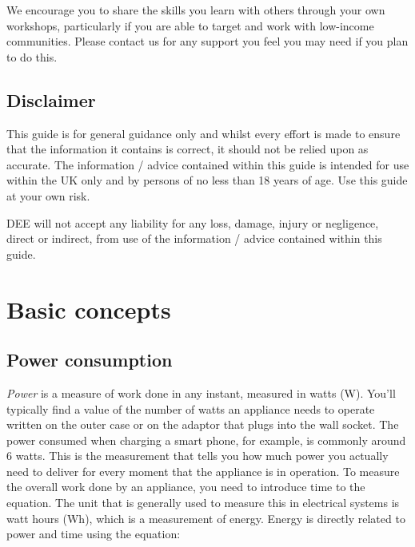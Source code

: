\documentclass{article}
\theoremstyle{definition}
\theoremstyle{definition}
\theoremstyle{remark}
\begin{document}
    We encourage you to share the skills you learn with others through your own workshops, particularly if you are able to target and work with low-income communities. Please contact us for any support you feel you may need if you plan to do this.
  
  
  \subsection{Disclaimer} %
  \label{sub:disclaimer}

    This guide is for general guidance only and whilst every effort is made to ensure that the information it contains is correct, it should not be relied upon as accurate. The information / advice contained within this guide is intended for use within the UK only and by persons of no less than 18 years of age. Use this guide at your own risk.
    
    DEE will not accept any liability for any loss, damage, injury or negligence, direct or indirect, from use of the information / advice contained within this guide.
  

  \newpage  


\section{Basic concepts} %
\label{sec:basic_concepts}
  
  \subsection{Power consumption} %
  \label{sub:power_consumption}

    \textit{Power} is a measure of work done in any instant, measured in watts (W). You'll typically find a value of the number of watts an appliance needs to operate written on the outer case or on the adaptor that plugs into the wall socket. The power consumed when charging a smart phone, for example, is commonly around 6 watts. This is the measurement that tells you how much power you actually need to deliver for every moment that the appliance is in operation. To measure the overall work done by an appliance, you need to introduce time to the equation. The unit that is generally used to measure this in electrical systems is watt hours (Wh), which is a measurement of energy. Energy is directly related to power and time using the equation: 
\end{document}
